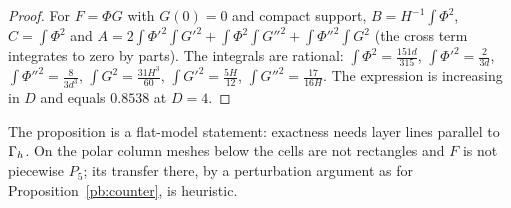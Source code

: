 \begin{proof}
For $F=\Phi G$ with $G(0)=0$ and compact support, $B=H^{-1}\int\Phi^2$, $C=\int\Phi^2$ and $A=2\int\Phi'^2\int G'^2+\int\Phi^2\int G''^2+\int\Phi''^2\int G^2$ (the cross term integrates to zero by parts). The integrals are rational: $\int\Phi^2=\frac{151d}{315}$, $\int\Phi'^2=\frac2{3d}$, $\int\Phi''^2=\frac8{3d^3}$, $\int G^2=\frac{31H^3}{60}$, $\int G'^2=\frac{5H}{12}$, $\int G''^2=\frac{17}{16H}$. The expression is increasing in $D$ and equals $0.8538$ at $D=4$.
\end{proof}

The proposition is a flat-model statement: exactness needs layer lines parallel to $\Gamma_h$. On the polar column meshes below the cells are not rectangles and $F$ is not piecewise $P_5$; its transfer there, by a perturbation argument as for Proposition~\ref{pb:counter}, is heuristic.

